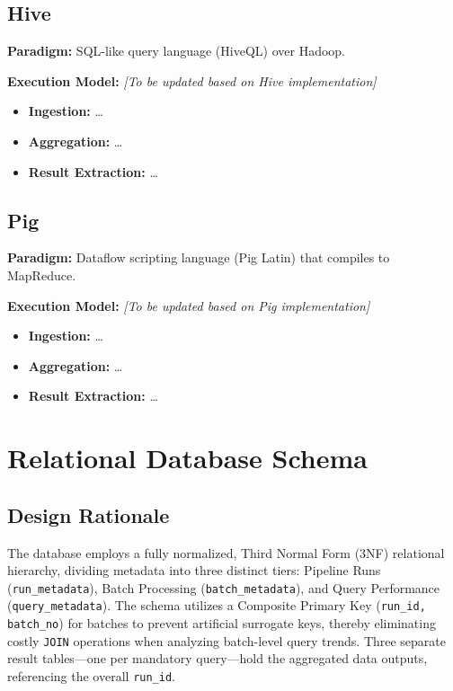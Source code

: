 \documentclass[11pt,a4paper]{article}
\begin{document}
\vspace{5pt}

\subsection{Hive}
\begin{hivebox}
\textbf{Paradigm:} SQL-like query language (HiveQL) over Hadoop.

\textbf{Execution Model:} 
\textit{[To be updated based on Hive implementation]}
\begin{itemize}
  \item \textbf{Ingestion:} \dots
  \item \textbf{Aggregation:} \dots
  \item \textbf{Result Extraction:} \dots
\end{itemize}
\end{hivebox}

\vspace{5pt}

\subsection{Pig}
\begin{pigbox}
\textbf{Paradigm:} Dataflow scripting language (Pig Latin) that compiles to MapReduce.

\textbf{Execution Model:} 
\textit{[To be updated based on Pig implementation]}
\begin{itemize}
  \item \textbf{Ingestion:} \dots
  \item \textbf{Aggregation:} \dots
  \item \textbf{Result Extraction:} \dots
\end{itemize}
\end{pigbox}

\section{Relational Database Schema}

\subsection{Design Rationale}

The database employs a fully normalized, Third Normal Form (3NF) relational hierarchy, dividing metadata into three distinct tiers: Pipeline Runs (\texttt{run\_metadata}), Batch Processing (\texttt{batch\_metadata}), and Query Performance (\texttt{query\_metadata}). The schema utilizes a Composite Primary Key (\texttt{run\_id, batch\_no}) for batches to prevent artificial surrogate keys, thereby eliminating costly \texttt{JOIN} operations when analyzing batch-level query trends. Three separate result tables---one per mandatory query---hold the aggregated data outputs, referencing the overall \texttt{run\_id}.
\end{document}
